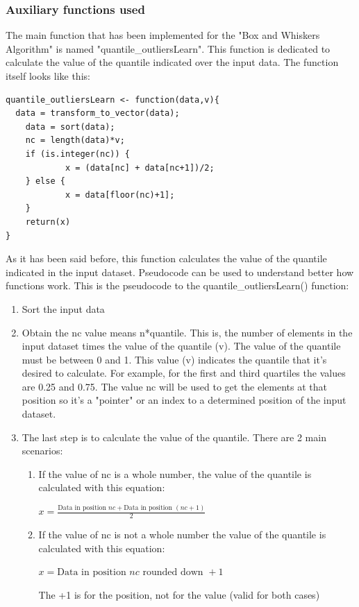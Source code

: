\documentclass{article}
\begin{document}
\subsubsection{Auxiliary functions used}
The main function that has been implemented for the "Box and Whiskers Algorithm" is named "quantile\_outliersLearn". This function is dedicated to calculate the value of the quantile indicated over the input data. The function itself looks like this:
\begin{center}
    \begin{lstlisting}[style=RStyle, caption=quantile\_outliersLearn function code]
quantile_outliersLearn <- function(data,v){
  data = transform_to_vector(data);
    data = sort(data);
    nc = length(data)*v;
    if (is.integer(nc)) {
            x = (data[nc] + data[nc+1])/2;
    } else {
            x = data[floor(nc)+1];
    }
    return(x)
}
    \end{lstlisting}
\end{center}
As it has been said before, this function calculates the value of the quantile indicated in the input dataset. Pseudocode can be used to understand better how functions work. This is the pseudocode to the quantile\_outliersLearn() function:
\begin{enumerate}
    \item Sort the input data
    \item Obtain the nc value means n*quantile. This is, the number of elements in the input dataset times the value of the quantile (v). The value of the quantile must be between 0 and 1. This value (v) indicates the quantile that it's desired to calculate. For example, for the first and third quartiles the values are 0.25 and 0.75. The value nc will be used to get the elements at that position so it's a "pointer" or an index to a determined position of the input dataset.
    \item The last step is to calculate the value of the quantile. There are 2 main scenarios:
    \begin{enumerate}
        \item If the value of nc is a whole number, the value of the quantile is calculated with this equation:
        \begin{center}
        \(
        x = \frac{{\text{Data in position } nc + \text{Data in position } (nc+1)}}{2}
        \)
        \end{center}
        \item If the value of nc is not a whole number the value of the quantile is calculated with this equation:
        \begin{center}
        \(
        x = \text{Data in position } nc \text{ rounded down } + 1
        \)
        \end{center}
        The +1 is for the position, not for the value (valid for both cases)
    \end{enumerate}
\end{enumerate}
\end{document}

